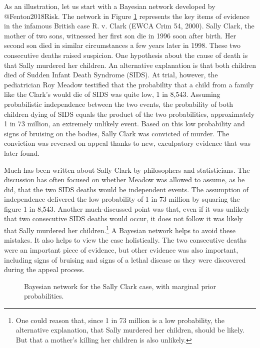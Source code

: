 \documentclass[
  letterpaper,
  DIV=11,
  numbers=noendperiod]{scrartcl}
\begin{document}
As an illustration, let us start with a Bayesian network developed by
@Fenton2018Risk. The network in Figure \ref{fig-scbnplot} represents the
key items of evidence in the infamous British case R. v. Clark (EWCA
Crim 54, 2000). Sally Clark, the mother of two sons, witnessed her first
son die in 1996 soon after birth. Her second son died in similar
circumstances a few years later in 1998. These two consecutive deaths
raised suspicion. One hypothesis about the cause of death is that Sally
murdered her children. An alternative explanation is that both children
died of Sudden Infant Death Syndrome (SIDS). At trial, however, the
pediatrician Roy Meadow testified that the probability that a child from
a family like the Clark's would die of SIDS was quite low, 1 in 8,543.
Assuming probabilistic independence between the two events, the
probability of both children dying of SIDS equals the product of the two
probabilities, approximately 1 in 73 million, an extremely unlikely
event. Based on this low probability and signs of bruising on the
bodies, Sally Clark was convicted of murder. The conviction was reversed
on appeal thanks to new, exculpatory evidence that was later found.

Much has been written about Sally Clark by philosophers and
statisticians. The discussion has often focused on whether Meadow was
allowed to assume, as he did, that the two SIDS deaths would be
independent events. The assumption of independence delivered the low
probability of 1 in 73 million by squaring the figure 1 in 8,543.
Another much-discussed point was that, even if it was unlikely that two
consecutive SIDS deaths would occur, it does not follow it was likely
that Sally murdered her children.\footnote{One could reason that, since
  1 in 73 million is a low probability, the alternative explanation,
  that Sally murdered her children, should be likely. But that a
  mother's killing her children is also unlikely.} A Bayesian network
helps to avoid these mistakes. It also helps to view the case
holistically. The two consecutive deaths were an important piece of
evidence, but other evidence was also important, including signs of
bruising and signs of a lethal disease as they were discovered during
the appeal process.

\begin{figure}[H]


\caption{\label{fig-scbnplot}Bayesian network for the Sally Clark case,
with marginal prior probabilities.}

\end{figure}%
\end{document}
